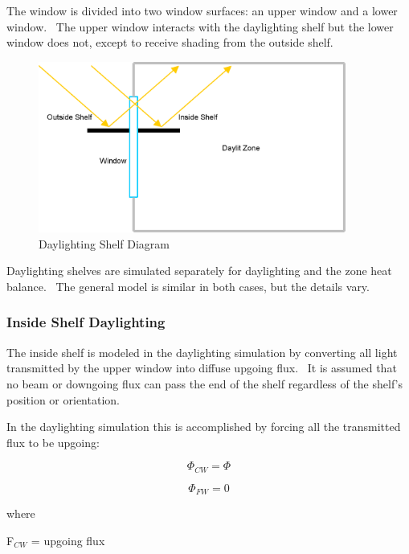 The window is divided into two window surfaces: an upper window and a lower window.~ The upper window interacts with the daylighting shelf but the lower window does not, except to receive shading from the outside shelf.

\begin{figure}[hbtp] %
\centering
\includegraphics[width=0.9\textwidth, height=0.9\textheight, keepaspectratio=true]{media/image893.png}
\caption{Daylighting Shelf Diagram \protect \label{fig:daylighting-shelf-diagram}}
\end{figure}

Daylighting shelves are simulated separately for daylighting and the zone heat balance.~ The general model is similar in both cases, but the details vary.

\subsubsection{Inside Shelf Daylighting}\label{inside-shelf-daylighting}

The inside shelf is modeled in the daylighting simulation by converting all light transmitted by the upper window into diffuse upgoing flux.~ It is assumed that no beam or downgoing flux can pass the end of the shelf regardless of the shelf's position or orientation.

In the daylighting simulation this is accomplished by forcing all the transmitted flux to be upgoing:

\begin{equation}
{\Phi_{CW}} = \Phi
\end{equation}

\begin{equation}
{\Phi_{FW}} = 0
\end{equation}

where

F\(_{CW}\) = upgoing flux

